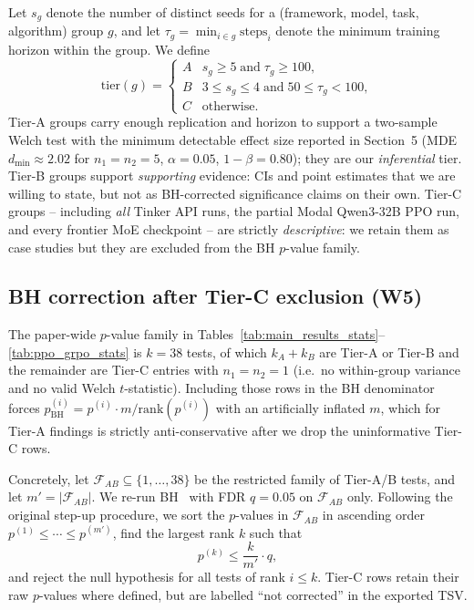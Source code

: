 Let $s_g$ denote the number of distinct seeds for a
(framework, model, task, algorithm) group $g$, and let
$\tau_g = \min_{i \in g} \mathrm{steps}_i$ denote the minimum training
horizon within the group. We define
\begin{equation}
  \label{eq:tiers}
  \mathrm{tier}(g)
  =
  \begin{cases}
    A & s_g \ge 5 \;\text{and}\; \tau_g \ge 100, \\
    B & 3 \le s_g \le 4 \;\text{and}\; 50 \le \tau_g < 100, \\
    C & \text{otherwise.}
  \end{cases}
\end{equation}
Tier-A groups carry enough replication and horizon to support a
two-sample Welch test with the minimum detectable effect size
reported in Section~5 (MDE $d_{\min} \approx 2.02$ for $n_1=n_2=5$,
$\alpha{=}0.05$, $1-\beta{=}0.80$); they are our \emph{inferential}
tier. Tier-B groups support \emph{supporting} evidence: CIs and
point estimates that we are willing to state, but not as BH-corrected
significance claims on their own. Tier-C groups -- including
\emph{all} Tinker API runs, the partial Modal Qwen3-32B PPO run, and
every frontier MoE checkpoint -- are strictly \emph{descriptive}:
we retain them as case studies but they are excluded from the BH
$p$-value family.

\subsection{BH correction after Tier-C exclusion (W5)}
\label{sec:stat-rigor-addendum:bh}

The paper-wide $p$-value family in
Tables~\ref{tab:main_results_stats}--\ref{tab:ppo_grpo_stats} is
\emph{$k=38$} tests, of which $k_A + k_B$ are Tier-A or Tier-B and the
remainder are Tier-C entries with $n_1{=}n_2{=}1$ (i.e.\ no within-group
variance and no valid Welch $t$-statistic). Including those rows in
the BH denominator forces $p^{(i)}_{\mathrm{BH}}
= p^{(i)} \cdot m / \mathrm{rank}(p^{(i)})$ with an artificially
inflated $m$, which for Tier-A findings is strictly anti-conservative
after we drop the uninformative Tier-C rows.

Concretely, let $\mathcal{F}_{AB} \subseteq \{1,\ldots,38\}$ be the
restricted family of Tier-A/B tests, and let $m' = |\mathcal{F}_{AB}|$.
We re-run BH~\citep{benjamini1995controlling} with FDR $q{=}0.05$ on
$\mathcal{F}_{AB}$ only. Following the original step-up procedure,
we sort the $p$-values in $\mathcal{F}_{AB}$ in ascending order
$p^{(1)} \le \cdots \le p^{(m')}$, find the largest rank $k$ such that
\begin{equation}
  \label{eq:bh-restricted}
  p^{(k)} \le \frac{k}{m'}\cdot q,
\end{equation}
and reject the null hypothesis for all tests of rank $i \le k$. Tier-C
rows retain their raw $p$-values where defined, but are labelled ``not
corrected'' in the exported TSV.

